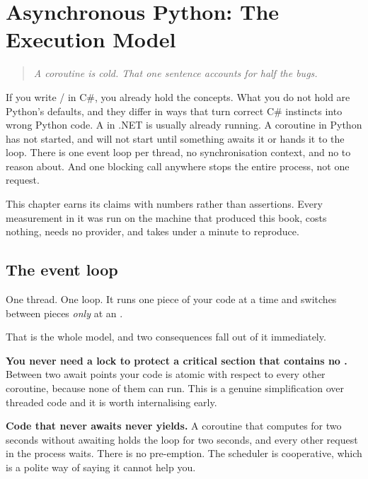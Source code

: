 \chapter{Asynchronous Python: The Execution Model}
\label{ch:asyncio}

\begin{quote}\itshape
A coroutine is cold. That one sentence accounts for half the bugs.
\end{quote}

\noindent
If you write / in C\#, you already hold the concepts.
What you do not hold are Python's defaults, and they differ in ways that turn
correct C\# instincts into wrong Python code. A  in .NET is usually
already running. A coroutine in Python has not started, and will not start until
something awaits it or hands it to the loop. There is one event loop per thread,
no synchronisation context, and no  to reason about. And one
blocking call anywhere stops the entire process, not one request.

This chapter earns its claims with numbers rather than assertions. Every
measurement in it was run on the machine that produced this book, costs nothing,
needs no provider, and takes under a minute to reproduce.

\section{The event loop}
\label{sec:event-loop}

One thread. One loop. It runs one piece of your code at a time and switches
between pieces \emph{only} at an .

That is the whole model, and two consequences fall out of it immediately.

\textbf{You never need a lock to protect a critical section that contains no
.} Between two await points your code is atomic with respect to
every other coroutine, because none of them can run. This is a genuine
simplification over threaded code and it is worth internalising early.

\textbf{Code that never awaits never yields.} A coroutine that computes for two
seconds without awaiting holds the loop for two seconds, and every other request
in the process waits. There is no pre-emption. The scheduler is cooperative,
which is a polite way of saying it cannot help you.

